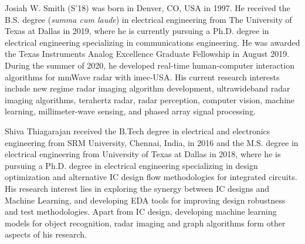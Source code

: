 \documentclass{ieeeaccess}
\begin{document}
\printbibliography

\begin{IEEEbiography}{Josiah W. Smith} (S'18) was born in Denver, CO, USA in 1997. He received the B.S. degree (\textit{summa cum laude}) in electrical engineering from The University of Texas at Dallas in 2019, where he is currently pursuing a Ph.D. degree in electrical engineering specializing in communications engineering. He was awarded the Texas Instruments Analog Excellence Graduate Fellowship in August 2019. During the summer of 2020, he developed real-time human-computer interaction algorithms for mmWave radar with imec-USA. His current research interests include new regime radar imaging algorithm development, ultrawideband radar imaging algorithms, terahertz radar, radar perception, computer vision, machine learning, millimeter-wave sensing, and phased array signal processing.
\end{IEEEbiography}

\begin{IEEEbiography}{Shiva Thiagarajan} received the B.Tech degree in electrical and electronics engineering from SRM University, Chennai, India, in 2016 and the M.S. degree in electrical engineering from University of Texas at Dallas in 2018, where he is pursuing a Ph.D. degree in electrical engineering specializing in design optimization and alternative IC design flow methodologies for integrated circuits. His research interest lies in exploring the synergy between IC designs and Machine Learning, and developing EDA tools for improving design robustness and test methodologies. Apart from IC design, developing machine learning models for object recognition, radar imaging and graph algorithms form other aspects of his research.
\end{IEEEbiography}
\end{document}
